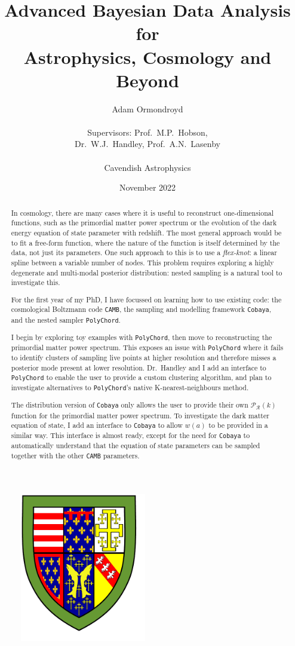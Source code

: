 \documentclass{article}
\title{Advanced Bayesian Data Analysis for \\ Astrophysics, Cosmology and Beyond}
\author{Adam Ormondroyd\\ \\Supervisors: Prof.~M.P.~Hobson, \\ Dr.~W.J.~Handley, Prof.~A.N.~Lasenby\\ \\Cavendish Astrophysics}
\date{November 2022}
\begin{document}
\setcounter{page}{0}
\maketitle

\begin{figure}[!h]
  \centering
  \includegraphics[width=5.5cm]{Queens'_shield.pdf}
  \label{fig:crest}
\end{figure}

\begin{abstract}

In cosmology, there are many cases where it is useful to reconstruct one-dimensional functions, such as the primordial matter power spectrum or the evolution of the dark energy equation of state parameter with redshift. The most general approach would be to fit a free-form function, where the nature of the function is itself determined by the data, not just its parameters. One such approach to this is to use a \textit{flex-knot}: a linear spline between a variable number of nodes. This problem requires exploring a highly degenerate and multi-modal posterior distribution: nested sampling is a natural tool to investigate this.

For the first year of my PhD, I have focussed on learning how to use existing code: the cosmological Boltzmann code \texttt{CAMB}, the sampling and modelling framework \texttt{Cobaya}, and the nested sampler \texttt{PolyChord}.

I begin by exploring toy examples with \texttt{PolyChord}, then move to reconstructing the primordial matter power spectrum. This exposes an issue with \texttt{PolyChord} where it fails to identify clusters of sampling live points at higher resolution and therefore misses a posterior mode present at lower resolution. Dr.~Handley and I add an interface to \texttt{PolyChord} to enable the user to provide a custom clustering algorithm, and plan to investigate alternatives to \texttt{PolyChord}'s native K-nearest-neighbours method.

The distribution version of \texttt{Cobaya} only allows the user to provide their own $\mathcal P_\mathcal R(k)$ function for the primordial matter power spectrum. To investigate the dark matter equation of state, I add an interface to \texttt{Cobaya} to allow $w(a)$ to be provided in a similar way. This interface is almost ready, except for the need for \texttt{Cobaya} to automatically understand that the equation of state parameters can be sampled together with the other \texttt{CAMB} parameters.
\end{abstract}
\end{document}
